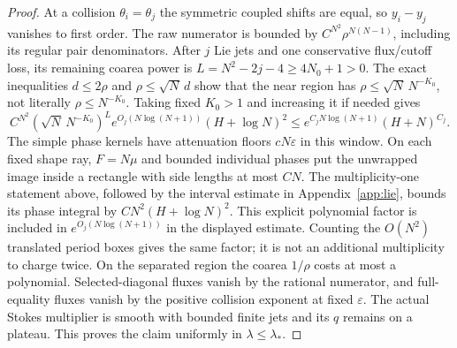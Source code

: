 \documentclass[11pt]{article}
\numberwithin{equation}{section}
\theoremstyle{definition}
\newcommand{\eps}{\varepsilon}
\begin{document}
\begin{proof}
At a collision \(\theta_i=\theta_j\) the symmetric coupled shifts
are equal, so \(y_i-y_j\) vanishes to first order. The raw numerator
is bounded by \(C^{N^2}\rho^{N(N-1)}\), including its regular pair
denominators. After \(j\) Lie jets and one conservative flux/cutoff
loss, its remaining coarea power is
\(L=N^2-2j-4\ge4N_0+1>0\).
The exact inequalities \(d\le2\rho\) and \(\rho\le\sqrt N\,d\)
show that the near region
has \(\rho\le\sqrt N\,N^{-K_0}\), not literally \(\rho\le N^{-K_0}\).
Taking fixed \(K_0>1\) and increasing it if needed gives
\[
 C^{N^2}(\sqrt N\,N^{-K_0})^L
      e^{O_j(N\log(N+1))}(H+\log N)^2
 \le e^{C_jN\log(N+1)}(H+N)^{C_j}.
\]
The simple phase kernels have attenuation floors \(cN\eps\) in
this window. On each fixed shape ray, \(F=N\mu\) and bounded individual
phases put the unwrapped image inside a rectangle with side lengths
at most \(CN\). The multiplicity-one statement above, followed by
the interval estimate in Appendix~\ref{app:lie}, bounds its phase
integral by \(CN^2(H+\log N)^2\). This explicit polynomial factor
is included in \(e^{O_j(N\log(N+1))}\) in the displayed estimate.
Counting the \(O(N^2)\) translated period boxes gives the same
factor; it is not an additional multiplicity to charge twice.
On the separated region the coarea \(1/\rho\) costs at most a
polynomial.
Selected-diagonal fluxes vanish by the rational numerator, and
full-equality fluxes vanish by the positive collision exponent at
fixed \(\eps\). The actual Stokes multiplier is smooth with bounded
finite jets and its \(q\) remains on a plateau. This proves the
claim uniformly in \(\lambda\le\lambda_*\).
\end{proof}
\end{document}
